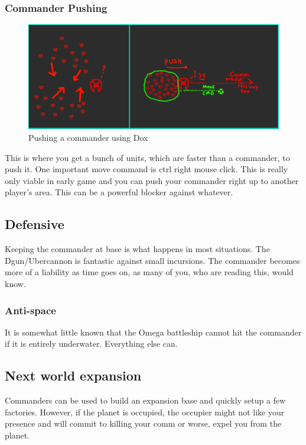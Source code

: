 \documentclass[]{article}
\begin{document}
\subsubsection{Commander Pushing}
\label{commpush}
\begin{figure}[htb]
	\centering
	\includegraphics[width=\linewidth]{uyhiwZs}
	\caption{Pushing a commander using Dox}
	\label{fig:uyhiwzs}
\end{figure}
This is where you get a bunch of units, which are faster than a commander, to push it.  One important move command is ctrl right mouse click.  This is really only viable in early game and you can push your commander right up to another player's area.  This can be a powerful blocker against whatever.  
\subsection{Defensive}

Keeping the commander at base is what happens in most situations.  The Dgun/Ubercannon is fantastic against small incursions.  The commander becomes more of a liability as time goes on, as many of you, who are reading this, would know.

\subsubsection{Anti-space}

It is somewhat little known that the Omega battleship cannot hit the commander if it is entirely underwater.  Everything else can.  



\subsection{Next world expansion}

Commanders can be used to build an expansion base and quickly setup a few factories.  However, if the planet is occupied, the occupier might not like your presence and will commit to killing your comm or worse, expel you from the planet.  
\end{document}

